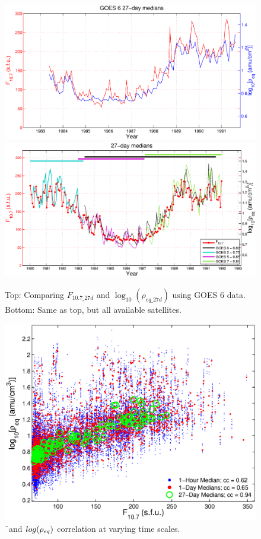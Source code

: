 \begin{figure}[htp!]
	\centering
	\includegraphics[width=0.95\linewidth]{Figures/F107MD27d-GOES6}
	\includegraphics[width=0.95\linewidth]{Figures/F107MD27d-all}
	\caption{Top: Comparing $F_{10.7\_27d}$ and $\log_{10}(\rho_{eq\_27d})$ using GOES 6 data. Bottom: Same as top, but all available satellites.}
	\label{fig:F107rhoeq27dcomparison}
\end{figure}

\begin{figure}[htp!]
	\centering
	\includegraphics[width=0.7\linewidth]{Figures/ccplot-GOES6}
	\caption{\f\ and $log(\rho_{eq})$ correlation at varying time scales.}
	\label{fig:ccplot}
\end{figure}



